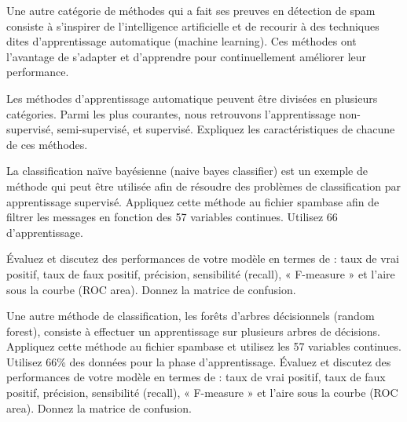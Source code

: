 	\begin{homeworkProblem}[Apprentissage automatique]
	
	
		Une autre catégorie de méthodes qui a fait ses preuves en détection de spam consiste à
		s’inspirer de l’intelligence artificielle et de recourir à des techniques dites d’apprentissage
		automatique (machine learning). Ces méthodes ont l’avantage de s’adapter et
		d’apprendre pour continuellement améliorer leur performance. 

	
		\begin{homeworkSection}{3.1}

			Les méthodes d’apprentissage automatique peuvent être divisées en plusieurs
			catégories. Parmi les plus courantes, nous retrouvons l’apprentissage non-supervisé,
			semi-supervisé, et supervisé. Expliquez les caractéristiques de chacune de ces méthodes.

			\problemAnswer{
			
			}
			
		\end{homeworkSection}
		
		\begin{homeworkSection}{3.2}

			La classification naïve bayésienne (naive bayes classifier) est un exemple de
			méthode qui peut être utilisée afin de résoudre des problèmes de classification par
			apprentissage supervisé. Appliquez cette méthode au fichier spambase afin de filtrer les
			messages en fonction des 57 variables continues. Utilisez 66%
			d’apprentissage.
			
			Évaluez et discutez des performances de votre modèle en termes de : taux de vrai positif,
			taux de faux positif, précision, sensibilité (recall), « F-measure » et l’aire sous la courbe
			(ROC area). Donnez la matrice de confusion.
	
			\problemAnswer{
			
			}
			
		\end{homeworkSection}
			
		\begin{homeworkSection}{3.3}

			Une autre méthode de classification, les forêts d’arbres décisionnels (random forest), consiste à
			effectuer un apprentissage sur plusieurs arbres de décisions. Appliquez
			cette méthode au fichier spambase et utilisez les 57 variables continues. Utilisez 66\% des
			données pour la phase d’apprentissage.
			Évaluez et discutez des performances de votre modèle en termes de : taux de vrai positif,
			taux de faux positif, précision, sensibilité (recall), « F-measure » et l’aire sous la courbe
			(ROC area). Donnez la matrice de confusion.


\end{homeworkSection}
\end{homeworkProblem}
